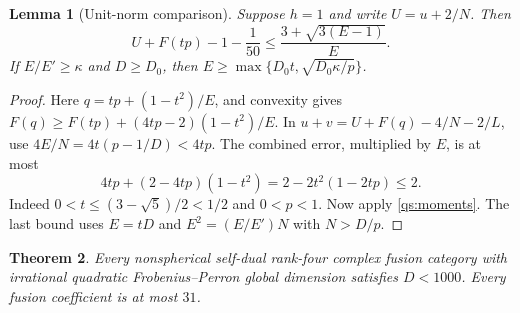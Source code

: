 \documentclass[11pt,a4paper]{article}
\newtheorem{theorem}{Theorem}[section]
\newtheorem{lemma}[theorem]{Lemma}
\theoremstyle{definition}\newtheorem{definition}[theorem]{Definition}
\theoremstyle{remark}\newtheorem{remark}[theorem]{Remark}
\numberwithin{equation}{section}
\begin{document}
\begin{lemma}[Unit-norm comparison]\label{quad:opt:unit-comparison}
Suppose $h=1$ and write $U=u+2/N$. Then
\[
 U+F(tp)-1-\frac1{50}
 \le \frac{3+\sqrt{3(E-1)}}{E}.
\]
If $E/E'\ge\kappa$ and $D\ge D_0$, then
$E\ge\max\{D_0t,\sqrt{D_0\kappa/p}\}$.
\end{lemma}
\begin{proof}
Here $q=tp+(1-t^2)/E$, and convexity gives
$F(q)\ge F(tp)+(4tp-2)(1-t^2)/E$.
In $u+v=U+F(q)-4/N-2/L$, use
$4E/N=4t(p-1/D)<4tp$. The combined error, multiplied by $E$, is at most
\[
 4tp+(2-4tp)(1-t^2)=2-2t^2(1-2tp)\le2.
\]
Indeed $0<t\le(3-\sqrt5)/2<1/2$ and $0<p<1$.
Now apply \eqref{qs:moments}. The last bound uses
$E=tD$ and $E^2=(E/E')N$ with $N>D/p$.
\end{proof}

\begin{theorem}\label{quad:opt:unconditional}
Every nonspherical self-dual rank-four complex fusion category
with irrational quadratic Frobenius--Perron global dimension satisfies
$D<1000$. Every fusion coefficient is at most $31$.
\end{theorem}
\end{document}
